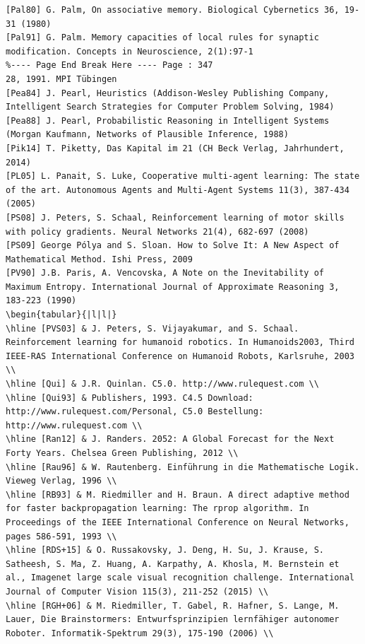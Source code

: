 \documentclass[10pt]{article}
\begin{document}
\begin{verbatim}
[Pal80] G. Palm, On associative memory. Biological Cybernetics 36, 19-31 (1980)
[Pal91] G. Palm. Memory capacities of local rules for synaptic modification. Concepts in Neuroscience, 2(1):97-1
%---- Page End Break Here ---- Page : 347
28, 1991. MPI Tübingen
[Pea84] J. Pearl, Heuristics (Addison-Wesley Publishing Company, Intelligent Search Strategies for Computer Problem Solving, 1984)
[Pea88] J. Pearl, Probabilistic Reasoning in Intelligent Systems (Morgan Kaufmann, Networks of Plausible Inference, 1988)
[Pik14] T. Piketty, Das Kapital im 21 (CH Beck Verlag, Jahrhundert, 2014)
[PL05] L. Panait, S. Luke, Cooperative multi-agent learning: The state of the art. Autonomous Agents and Multi-Agent Systems 11(3), 387-434 (2005)
[PS08] J. Peters, S. Schaal, Reinforcement learning of motor skills with policy gradients. Neural Networks 21(4), 682-697 (2008)
[PS09] George Pólya and S. Sloan. How to Solve It: A New Aspect of Mathematical Method. Ishi Press, 2009
[PV90] J.B. Paris, A. Vencovska, A Note on the Inevitability of Maximum Entropy. International Journal of Approximate Reasoning 3, 183-223 (1990)
\begin{tabular}{|l|l|}
\hline [PVS03] & J. Peters, S. Vijayakumar, and S. Schaal. Reinforcement learning for humanoid robotics. In Humanoids2003, Third IEEE-RAS International Conference on Humanoid Robots, Karlsruhe, 2003 \\
\hline [Qui] & J.R. Quinlan. C5.0. http://www.rulequest.com \\
\hline [Qui93] & Publishers, 1993. C4.5 Download: http://www.rulequest.com/Personal, C5.0 Bestellung: http://www.rulequest.com \\
\hline [Ran12] & J. Randers. 2052: A Global Forecast for the Next Forty Years. Chelsea Green Publishing, 2012 \\
\hline [Rau96] & W. Rautenberg. Einführung in die Mathematische Logik. Vieweg Verlag, 1996 \\
\hline [RB93] & M. Riedmiller and H. Braun. A direct adaptive method for faster backpropagation learning: The rprop algorithm. In Proceedings of the IEEE International Conference on Neural Networks, pages 586-591, 1993 \\
\hline [RDS+15] & O. Russakovsky, J. Deng, H. Su, J. Krause, S. Satheesh, S. Ma, Z. Huang, A. Karpathy, A. Khosla, M. Bernstein et al., Imagenet large scale visual recognition challenge. International Journal of Computer Vision 115(3), 211-252 (2015) \\
\hline [RGH+06] & M. Riedmiller, T. Gabel, R. Hafner, S. Lange, M. Lauer, Die Brainstormers: Entwurfsprinzipien lernfähiger autonomer Roboter. Informatik-Spektrum 29(3), 175-190 (2006) \\

\end{verbatim}
\end{document}
